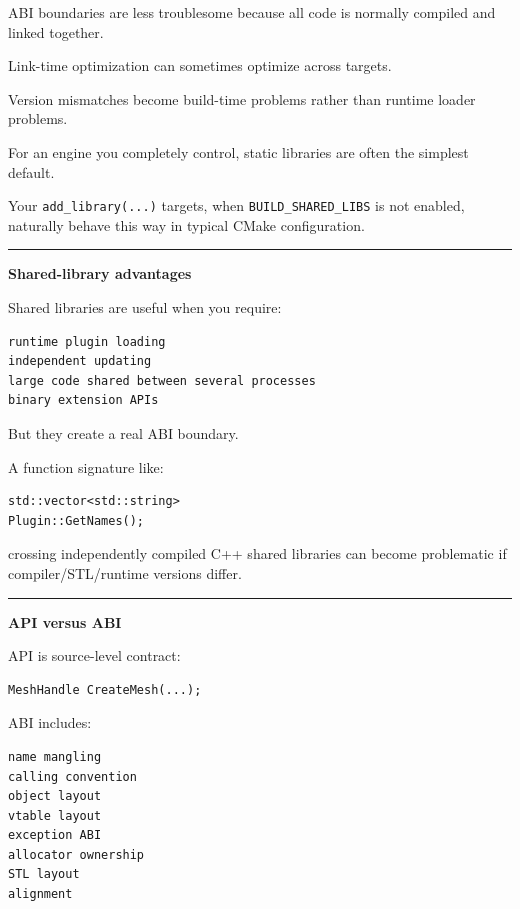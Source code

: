 ABI boundaries are less troublesome because all code is normally compiled and linked together.

Link-time optimization can sometimes optimize across targets.

Version mismatches become build-time problems rather than runtime loader problems.

For an engine you completely control, static libraries are often the simplest default.

Your \texttt{add\_library(...)} targets, when \texttt{BUILD\_SHARED\_LIBS} is not enabled, naturally behave this way in typical CMake configuration.

\begin{center}\rule{0.5\linewidth}{0.5pt}\end{center}

\textbf{Shared-library advantages}

Shared libraries are useful when you require:

\begin{verbatim}
runtime plugin loading
independent updating
large code shared between several processes
binary extension APIs
\end{verbatim}

But they create a real ABI boundary.

A function signature like:

\begin{verbatim}
std::vector<std::string>
Plugin::GetNames();
\end{verbatim}

crossing independently compiled C++ shared libraries can become problematic if compiler/STL/runtime versions differ.

\begin{center}\rule{0.5\linewidth}{0.5pt}\end{center}

\textbf{API versus ABI}

API is source-level contract:

\begin{verbatim}
MeshHandle CreateMesh(...);
\end{verbatim}

ABI includes:

\begin{verbatim}
name mangling
calling convention
object layout
vtable layout
exception ABI
allocator ownership
STL layout
alignment
\end{verbatim}

